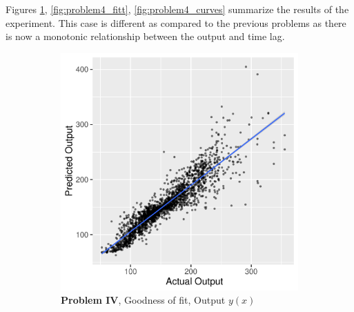 \documentclass[envcountsect,runningheads]{llncs}
\theoremstyle{etoile}
\begin{document}
Figures \ref{fig:problem4_fitv}, \ref{fig:problem4_fitt}, \ref{fig:problem4_curves} summarize 
the results of the experiment. This case is different as compared to the previous problems as there 
is now a monotonic relationship between the output and time lag. %


\begin{figure}
  \centering

  \begin{subfigure}[b]{0.4\textwidth}
    \centering
    \includegraphics[width=\textwidth]{figures/exp4_scatter_v_test}
    \caption{ \textbf{Problem IV}, Goodness of fit, Output $y(x)$}
    \label{fig:problem4_fitv}
  \end{subfigure}
  \hfill
  \begin{subfigure}[b]{0.4\textwidth}
    \centering

\end{subfigure}
\end{figure}
\end{document}
